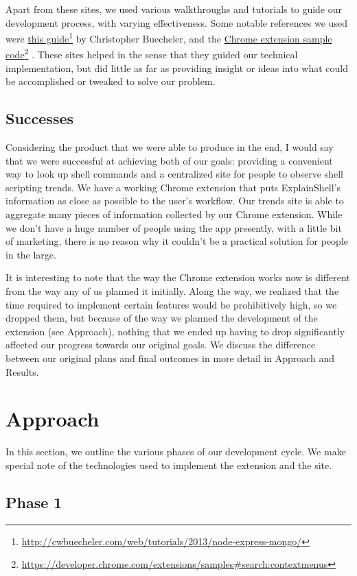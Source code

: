 \documentclass[11pt]{article}
\newcommand\fnurl[2]{%
\href{#1}{#2}\footnote{\url{#1}}%
}
\begin{document}
Apart from these sites, we used various walkthroughs and tutorials to guide our
development process, with varying effectiveness. Some notable references we used
were \fnurl{http://cwbuecheler.com/web/tutorials/2013/node-express-mongo/}{this
guide} by Christopher Buecheler, and the
\fnurl{https://developer.chrome.com/extensions/samples\#search:contextmenus}%
{Chrome extension sample code}. These sites helped in the sense that they guided
our technical implementation, but did little as far as providing insight or
ideas into what could be accomplished or tweaked to solve our problem.

\subsection{Successes}

Considering the product that we were able to produce in the end, I would say
that we were successful at achieving both of our goals: providing a convenient
way to look up shell commands and a centralized site for people to observe shell
scripting trends. We have a working Chrome extension that puts ExplainShell's
information as close as possible to the user's workflow. Our trends site is able
to aggregate many pieces of information collected by our Chrome extension. While
we don't have a huge number of people using the app presently, with a little bit
of marketing, there is no reason why it couldn't be a practical solution for people
in the large.

It is interesting to note that the way the Chrome extension works now is
different from the way any of us planned it initially. Along the way, we
realized that the time required to implement certain features would be
prohibitively high, so we dropped them, but because of the way we planned the
development of the extension (see Approach), nothing that we ended up having to
drop significantly affected our progress towards our original goals. We discuss
the difference between our original plans and final outcomes in more detail in
Approach and Results.

\section{Approach}

In this section, we outline the various phases of our development cycle. We make
special note of the technologies used to implement the extension and the site.

\subsection{Phase 1}
\end{document}
